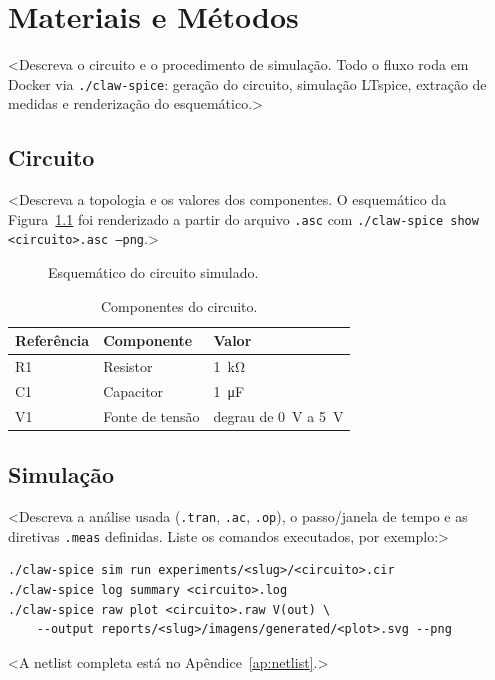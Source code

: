 \chapter{Materiais e Métodos}
\label{cap:metodologia}

<Descreva o circuito e o procedimento de simulação. Todo o fluxo roda em
Docker via \texttt{./claw-spice}: geração do circuito, simulação LTspice,
extração de medidas e renderização do esquemático.>

\section{Circuito}
\label{sec:circuito}

<Descreva a topologia e os valores dos componentes. O esquemático da
Figura~\ref{fig:esquematico} foi renderizado a partir do arquivo
\texttt{.asc} com \texttt{./claw-spice show <circuito>.asc --png}.>

\begin{figure}[htb]
  \centering
  \caption{Esquemático do circuito simulado.}
  \label{fig:esquematico}
\end{figure}

\begin{table}[htb]
  \centering
  \caption{Componentes do circuito.}
  \label{tab:componentes}
  \begin{tabular}{lll}
    \toprule
    Referência & Componente & Valor \\
    \midrule
    R1 & Resistor  & \SI{1}{\kilo\ohm} \\
    C1 & Capacitor & \SI{1}{\micro\farad} \\
    V1 & Fonte de tensão & degrau de \SI{0}{\volt} a \SI{5}{\volt} \\
    \bottomrule
  \end{tabular}
\end{table}

\section{Simulação}
\label{sec:simulacao}

<Descreva a análise usada (\texttt{.tran}, \texttt{.ac}, \texttt{.op}),
o passo/janela de tempo e as diretivas \texttt{.meas} definidas. Liste os
comandos executados, por exemplo:>

\begin{verbatim}
./claw-spice sim run experiments/<slug>/<circuito>.cir
./claw-spice log summary <circuito>.log
./claw-spice raw plot <circuito>.raw V(out) \
    --output reports/<slug>/imagens/generated/<plot>.svg --png
\end{verbatim}

<A netlist completa está no Apêndice~\ref{ap:netlist}.>
